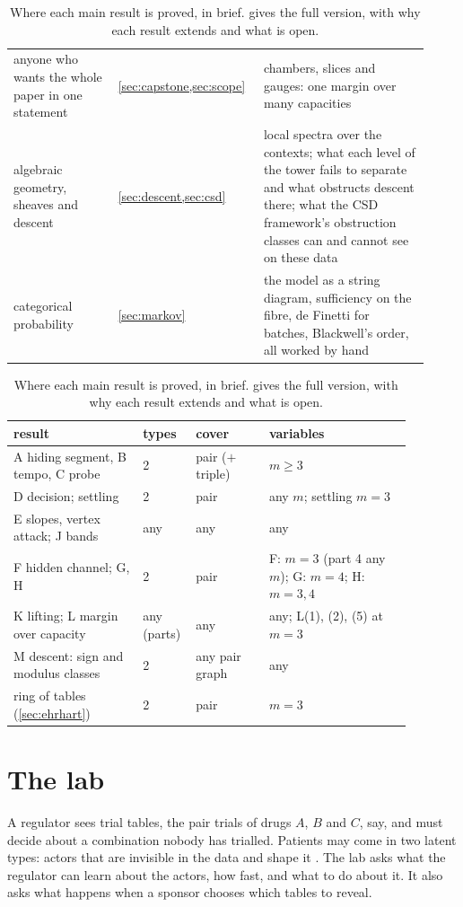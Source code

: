 \documentclass[11pt]{article}
\theoremstyle{definition}\newtheorem{definition}{Definition}\newtheorem{remark}{Remark}
\begin{document}
\begin{table}[!h]
\begin{tabular}{p{0.24\linewidth}p{0.3\linewidth}p{0.38\linewidth}}
anyone who wants the whole paper in one statement & \cref{sec:capstone,sec:scope} & chambers, slices and gauges: one margin over many capacities\\[2pt]
algebraic geometry, sheaves and descent & \cref{sec:descent,sec:csd} & local spectra over the contexts; what each level of the tower fails to separate and what obstructs descent there; what the CSD framework's obstruction classes can and cannot see on these data\\[2pt]
categorical probability & \cref{sec:markov} & the model as a string diagram, sufficiency on the fibre, de Finetti for batches, Blackwell's order, all worked by hand\\\bottomrule
\end{tabular}
\caption{Reading guide.}\label{tab:guide}
\bigskip
\begin{tabular}{p{0.3\linewidth}p{0.08\linewidth}p{0.17\linewidth}p{0.33\linewidth}}\toprule
result & types & cover & variables\\\midrule
A hiding segment, B tempo, C probe & 2 & pair ($+$ triple) & $m\ge3$\\
D decision; settling & 2 & pair & any $m$; settling $m=3$\\
E slopes, vertex attack; J bands & any & any & any\\
F hidden channel; G, H & 2 & pair & F: $m=3$ (part 4 any $m$); G: $m=4$; H: $m=3,4$\\
K lifting; L margin over capacity & any (parts) & any & any; L(1), (2), (5) at $m=3$\\
M descent: sign and modulus classes & 2 & any pair graph & any\\
ring of tables (\cref{sec:ehrhart}) & 2 & pair & $m=3$\\\bottomrule
\end{tabular}
\caption{Where each main result is proved, in brief.  gives the full version, with why each result extends and what is
open.}\label{tab:scopeshort}
\end{table}

\section{The lab}\label{sec:intro}
A regulator sees trial tables, the pair trials of drugs $A$, $B$ and $C$, say, and must decide about a combination nobody has
trialled. Patients may come in two latent types: actors that are invisible in the data and shape it \cite{PG}. The lab asks what the
regulator can learn about the actors, how fast, and what to do about it. It also asks what happens when a sponsor chooses which
tables to reveal.
\end{document}
